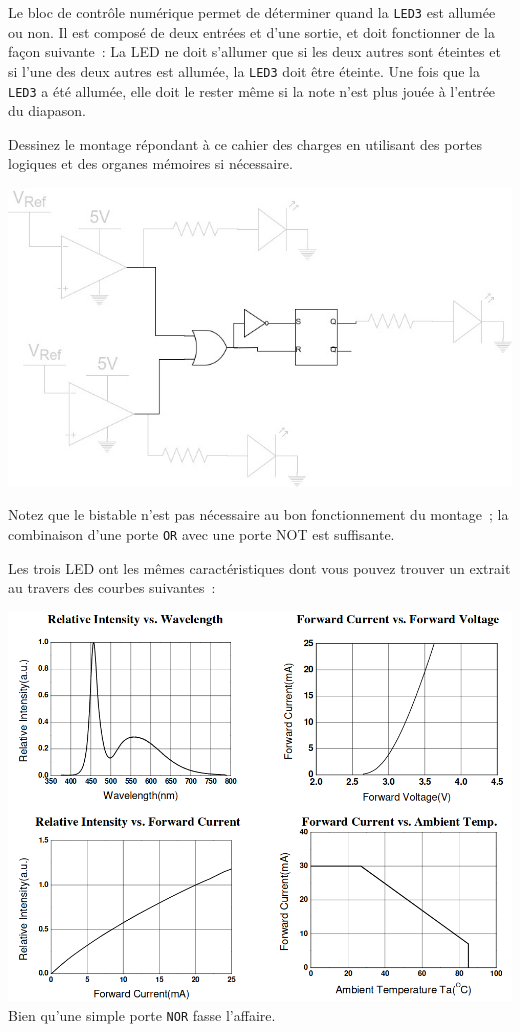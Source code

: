 \documentclass{../template/tp}
\begin{document}
\Question
{
Le bloc de contrôle numérique permet de déterminer quand la \texttt{LED3} est allumée ou non.
Il est composé de deux entrées et d'une sortie, et doit fonctionner de la façon suivante~:
La LED ne doit s'allumer que si les deux autres sont éteintes et si l'une des deux autres est allumée, la \texttt{LED3} doit être éteinte. Une fois que la \texttt{LED3} a été allumée, elle doit le rester même si la note n'est plus jouée à l'entrée du diapason.

Dessinez le montage répondant à ce cahier des charges en utilisant des portes logiques et des organes mémoires si nécessaire.
}
{
\begin{center}
\includegraphics[width=\textwidth]{elech301_schema-bloc_logic.jpg}
\end{center}

Notez que le bistable n'est pas nécessaire au bon fonctionnement du montage~; la combinaison d'une porte \texttt{OR} avec une porte {NOT} est suffisante.
}


Les trois LED ont les mêmes caractéristiques dont vous pouvez trouver un extrait au travers des courbes suivantes~:

\begin{center}
\includegraphics[width=.8\textwidth]{led_datasheet.png}
Bien qu'une simple porte \texttt{NOR} fasse l'affaire.
\end{center}
\end{document}
